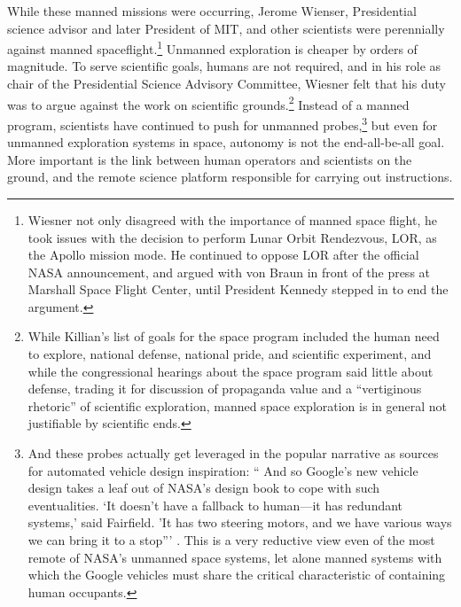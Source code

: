 While these manned missions were occurring, Jerome Wienser,
Presidential science advisor and later President of MIT, and other
scientists were perennially against manned
spaceflight.\footnote{Wiesner not only disagreed with the importance
  of manned space flight, he took issues with the decision to perform
  Lunar Orbit Rendezvous, LOR, as the Apollo mission mode. He
  continued to oppose LOR after the official NASA announcement, and
  argued with von Braun in front of the
  press at Marshall Space Flight Center, until President Kennedy
  stepped in to end the argument\cite{???}.} Unmanned exploration is
cheaper by orders of magnitude\cite[p. 66]{???-coxMurray}. To serve
scientific goals, humans are not required, and in his role as chair of
the Presidential Science Advisory Committee, Wiesner felt that his
duty was to argue against the work on scientific
grounds\cite{???}.\footnote{While Killian's list of goals for the
  space program included the human need to explore, national defense,
  national pride, and scientific experiment, and while the
  congressional hearings about the space program said little about
  defense, trading it for discussion of propaganda value and a
  ``vertiginous rhetoric'' of scientific exploration, manned space
  exploration is in general not justifiable by scientific ends\cite[p.
    194-197]{smithSelling}.} Instead of a manned program, scientists
have continued to push for unmanned probes,\footnote{And these probes
  actually get leveraged in the popular narrative as sources for
  automated vehicle design inspiration: `` And so Google's new vehicle
  design 
takes a leaf out of NASA's design book to cope with such
eventualities. `It doesn't have a fallback to human---it has redundant
systems,' said Fairfield. 'It has two steering motors, and we have
various ways we can bring it to a stop''' \cite{simonite}. This is a
very reductive view even of the most remote of NASA's unmanned space
systems, let alone manned systems with which the Google vehicles must share
the critical characteristic of containing human occupants.} but even for
unmanned exploration systems in space, autonomy is not the
end-all-be-all goal. More important is the link between human
operators and scientists on the ground, and the remote science
platform responsible for carrying out instructions. 

